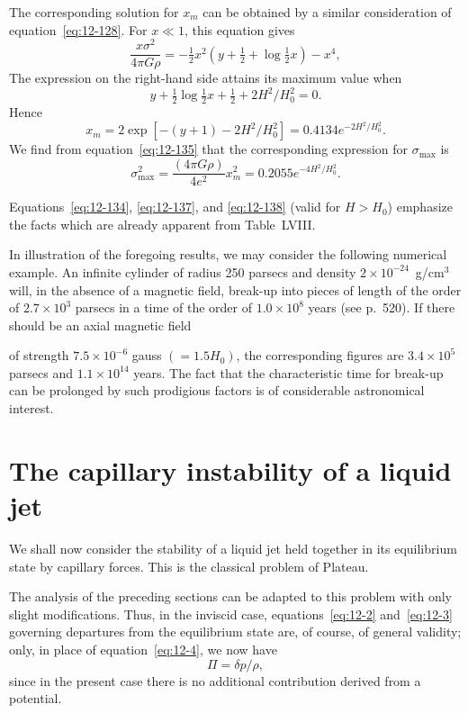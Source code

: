The corresponding solution for $x_m$ can be obtained by a similar consideration of equation~\eqref{eq:12-128}. For $x \ll 1$, this equation gives
\begin{equation}
\label{eq:12-135}
\frac{x\sigma^2}{4\pi G\rho} = -\tfrac{1}{2}x^2(y + \tfrac{1}{2} + \log \tfrac{1}{2}x) - x^4,
\end{equation}
The expression on the right-hand side attains its maximum value when
\begin{equation}
\label{eq:12-136}
y + \tfrac{1}{2}\log\tfrac{1}{2}x + \tfrac{1}{2} + 2H^2/H_0^2 = 0.
\end{equation}
Hence
\begin{equation}
\label{eq:12-137}
x_m = 2\exp[-(y+1) - 2H^2/H_0^2] = 0.4134 e^{-2H^2/H_0^2}.
\end{equation}
We find from equation~\eqref{eq:12-135} that the corresponding expression for $\sigma_{\max}$ is
\begin{equation}
\label{eq:12-138}
\sigma_{\max}^2 = \frac{(4\pi G\rho)}{4e^2} x_m^2 = 0.2055 e^{-4H^2/H_0^2}.
\end{equation}

Equations~\eqref{eq:12-134}, \eqref{eq:12-137}, and \eqref{eq:12-138} (valid for $H > H_0$) emphasize the facts which are already apparent from Table~LVIII.

In illustration of the foregoing results, we may consider the following numerical example. An infinite cylinder of radius 250 parsecs and density $2 \times 10^{-24}$~g/cm$^3$ will, in the absence of a magnetic field, break-up into pieces of length of the order of $2.7 \times 10^3$ parsecs in a time of the order of $1.0 \times 10^8$ years (see p.~520). If there should be an axial magnetic field

of strength $7.5 \times 10^{-6}$ gauss $(= 1.5H_0)$, the corresponding figures are $3.4 \times 10^5$ parsecs and $1.1 \times 10^{14}$ years. The fact that the characteristic time for break-up can be prolonged by such prodigious factors is of considerable astronomical interest.

\section{The capillary instability of a liquid jet}\label{sec:111}
We shall now consider the stability of a liquid jet held together in its equilibrium state by capillary forces. This is the classical problem of Plateau.

The analysis of the preceding sections can be adapted to this problem with only slight modifications. Thus, in the inviscid case, equations~\eqref{eq:12-2} and~\eqref{eq:12-3} governing departures from the equilibrium state are, of course, of general validity; only, in place of equation~\eqref{eq:12-4}, we now have
\begin{equation}
\label{eq:12-139}
\Pi = \delta p / \rho,
\end{equation}
since in the present case there is no additional contribution derived from a potential.

